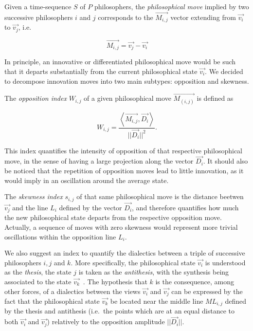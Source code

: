 \documentclass[%
 aip,
 jmp,%
 amsmath,amssymb,
 reprint,%
]{revtex4-1}
\begin{document}
Given a time-sequence $S$ of $P$ philosophers, the \emph{philosophical
move} implied by two successive philosophers $i$ and $j$ corresponds
to the $\vec{M_{i,j}}$ vector extending from $\vec{v_i}$ to
$\vec{v_j}$, i.e.

\begin{equation}
  \vec{M_{i,j}} = \vec{v_j} - \vec{v_i}
\end{equation}

In principle, an innovative or differentiated philosophical move would
be such that it departs substantially from the current philosophical
state $\vec{v_i}$.  We decided to decompose innovation moves into two
main subtypes: opposition and skewness.

The \emph{opposition index} $W_{i,j}$ of a given philosophical move
$\vec{M_{(i,j)}}$ is defined as

\begin{equation}
  W_{i,j} = \frac{\left< \vec{M_{i,j}}, \vec{D_i}\right>}{||\vec{D_i}||^2}. 
\end{equation}

This index quantifies the intensity of opposition of that respective
philosophical move, in the sense of having a large projection along
the vector $\vec{D_i}$.  It should also be noticed that the repetition
of opposition moves lead to little innovation, as it would imply in an
oscillation around the average state.

The \emph{skewness index} $s_{i,j}$ of that same philosophical move is
the distance beetwen $\vec{v_j}$ and the line $L_i$ defined by the
vector $\vec{D_i}$, and therefore quantifies how much the new
philosophical state departs from the respective opposition move.
Actually, a sequence of moves with zero skewness would represent more
trivial oscillations within the opposition line $L_i$.

We also suggest an index to quantify the dialectics between a triple
of successive philosophers $i, j$ and $k$.  More specifically, the
philosophical state $\vec{v_i}$ is understood as the \emph{thesis},
the state $j$ is taken as the \emph{antithesis}, with the synthesis
being associated to the state $\vec{v_k}$~\cite{Papineau}.  The
hypothesis that $k$ is the consequence, among other forces, of a
dialectics between the views $\vec{v_i}$ and $\vec{v_j}$ can be
expressed by the fact that the philosophical state $\vec{v_k}$ be
located near the middle line $ML_{i,j}$ defined by the thesis and
antithesis (i.e.\ the points which are at an equal distance to both
$\vec{v_i}$ and $\vec{v_j}$) relatively to the opposition amplitude
$|| \vec{D_i} ||$.
\end{document}
